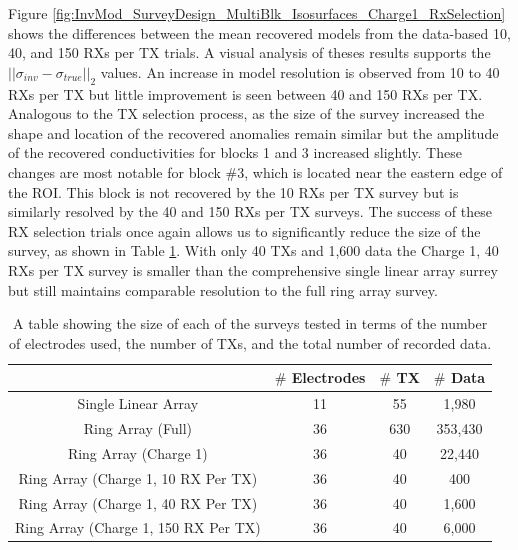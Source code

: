\documentclass[preprint,authoryear,12pt]{elsarticle}
\begin{document}
Figure \ref{fig:InvMod_SurveyDesign_MultiBlk_Isosurfaces_Charge1_RxSelection} shows the differences between the mean recovered models from the data-based 10, 40, and 150 RXs per TX trials. A visual analysis of theses results supports the $\left|| \sigma_{inv} - \sigma_{true} \right||_2$ values. An increase in model resolution is observed from 10 to 40 RXs per TX but little improvement is seen between 40 and 150 RXs per TX. Analogous to the TX selection process, as the size of the survey increased the shape and location of the recovered anomalies remain similar but the amplitude of the recovered conductivities for blocks 1 and 3 increased slightly. These changes are most notable for block \#3, which is located near the eastern edge of the ROI. This block is not recovered by the 10 RXs per TX survey but is similarly resolved by the 40 and 150 RXs per TX surveys. The success of these RX selection trials once again allows us to significantly reduce the size of the survey, as shown in Table \ref{table:SurveyDesign_RxSelection_SurveyStats}. With only 40 TXs and 1,600 data the Charge 1, 40 RXs per TX survey is smaller than the comprehensive single linear array surrey but still maintains comparable resolution to the full ring array survey.


\begin{table} [htp]
   \footnotesize
    \begin{center}
        \begin{tabular}{| c | c | c | c |}
            \hline
             & \textbf{\mbox{\boldmath$\#$} Electrodes} & \textbf{\mbox{\boldmath$\#$} TX} & \textbf{\mbox{\boldmath$\#$} Data}\\
            \hline
            Single Linear Array & 11 & 55 & 1,980 \\
            \hline
            Ring Array (Full) & 36 & 630 & 353,430 \\
            \hline
            Ring Array (Charge 1) & 36 & 40 &  22,440\\
            \hline
            Ring Array (Charge 1, 10 RX Per TX) & 36 & 40 &  400\\
            \hline
            Ring Array (Charge 1, 40 RX Per TX) & 36 & 40 &  1,600\\
            \hline
            Ring Array (Charge 1, 150 RX Per TX) & 36 & 40 &  6,000\\
            \hline
        \end{tabular}
    \end{center}
\caption{A table showing the size of each of the surveys tested in terms of the number of electrodes used, the number of TXs, and the total number of recorded data.}
\label{table:SurveyDesign_RxSelection_SurveyStats}
\end{table}
\end{document}
